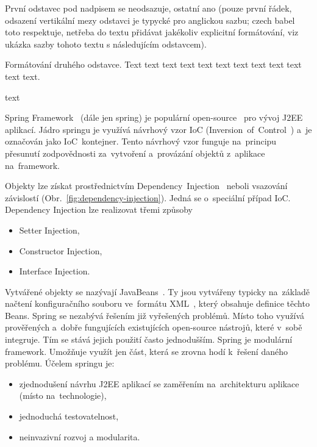 
První odstavec pod nadpisem se neodsazuje, ostatní ano (pouze první řádek, odsazení vertikální mezy odstavci je typycké pro anglickou sazbu; czech babel toto respektuje, netřeba do textu přidávat jakékoliv explicitní formátování, viz ukázka sazby tohoto textu s následujícím odstavcem).

Formátování druhého odstavce. Text text text text text text text text text text text text.



text

Spring Framework~\cite{spring-framework} (dále jen spring) je populární open-source~\cite{open-source} pro vývoj J2EE~\cite{j2ee} aplikací. Jádro springu je využívá návrhový vzor IoC (Inversion~of~Control~\cite{ioc}) a~je označován jako IoC~kontejner. Tento návrhový vzor funguje na~principu přesunutí zodpovědnosti za~vytvoření a~provázání objektů z~aplikace na~framework.

Objekty lze získat prostřednictvím Dependency~Injection~\cite{dependency-injection} neboli vsazování závislostí (Obr.~\ref{fig:dependency-injection}). Jedná se o~speciální případ IoC. Dependency Injection lze realizovat třemi způsoby
\begin{itemize}
	\setlength{\parskip}{0pt}
	\setlength{\itemsep}{0pt}
	\item {Setter Injection,}
	\item {Constructor Injection,}
	\item {Interface Injection.}
\end{itemize}


Vytvářené objekty se nazývají JavaBeans~\cite{java-beans}. Ty jsou vytvářeny typicky na~základě načtení konfiguračního souboru ve~formátu XML~\cite{xml}, který obsahuje definice těchto Beans. Spring se nezabývá řešením již vyřešených problémů. Místo toho využívá prověřených a~dobře fungujících existujících open-source nástrojů, které v~sobě integruje. Tím se stává jejich použití často jednodušším. Spring je modulární framework. Umožňuje využít jen část, která se zrovna hodí k~řešení daného problému. Účelem springu je:
\begin{itemize}
	\setlength{\parskip}{0pt}
	\setlength{\itemsep}{0pt}
	\item {zjednodušení návrhu J2EE aplikací se zaměřením na~architekturu aplikace (místo na~technologie),}
	\item {jednoduchá testovatelnost,}
	\item {neinvazivní rozvoj a modularita.}
\end{itemize}

